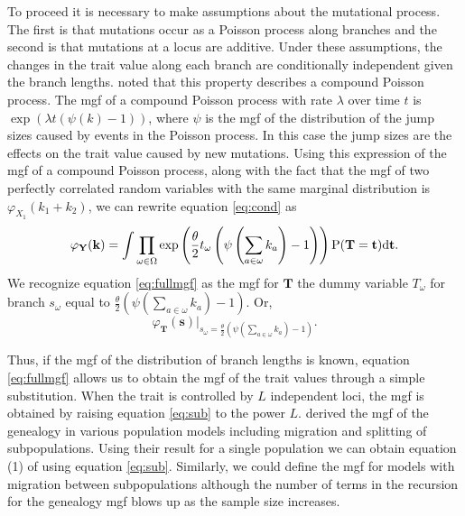 To proceed it is necessary to make assumptions about the mutational process. The
first is that mutations occur as a Poisson process along branches and the second
is that mutations at a locus are additive. Under these assumptions, the changes
in the trait value along each branch are conditionally independent given the
branch lengths. \citet{Khaitovich2005} noted that this property describes a
compound Poisson process. The mgf of a compound Poisson process with rate
$\lambda$ over time $t$ is $\exp(\lambda t (\psi(k)-1))$, where $\psi$ is the
mgf of the distribution of the jump sizes caused by events in the Poisson
process. In this case the jump sizes are the effects on the trait value caused
by new mutations. Using this expression of the mgf of a compound Poisson
process, along with the fact that the mgf of two perfectly correlated random
variables with the same marginal distribution is $\varphi_{X_1}(k_1+k_2)$, we
can rewrite equation \eqref{eq:cond} as
\begin{equation}
  \label{eq:fullmgf}
  \varphi_{\mathbf{Y}}(\mathbf{k}) = 
  \int \prod_{\omega \in \Omega} \exp\left( \frac{\theta}{2} t_{\omega} \left( \psi\left(\sum_{a \in \omega}k_{a}\right) -1 \right)\right)
  \mathrm{P}(\mathbf{T}=\mathbf{t})\mbox{d}\mathbf{t}.
\end{equation}
We recognize equation \eqref{eq:fullmgf} as the mgf for $\mathbf{T}$ the dummy
variable $T_{\omega}$ for branch $s_\omega$ equal to
$\frac{\theta}{2} \left( \psi(\sum_{a \in \omega}k_{a}) -1 \right)$. Or,
\begin{equation}
  \label{eq:sub}
  \varphi_{\mathbf{T}}(\mathbf{s})\Bigr|_{s_{\omega}=\frac{\theta}{2} \left( \psi\left(\sum_{a \in \omega}k_{a}\right) -1 \right)}.
\end{equation}

Thus, if the mgf of the distribution of branch lengths is known, equation
\eqref{eq:fullmgf} allows us to obtain the mgf of the trait values through a
simple substitution. When the trait is controlled by $L$ independent loci, the
mgf is obtained by raising equation \eqref{eq:sub} to the power $L$.
\citet{Lohse2011} derived the mgf of the genealogy in various population models
including migration and splitting of subpopulations. Using their result for a
single population we can obtain equation (1) of \citet{Schraiber2015} using
equation \eqref{eq:sub}. Similarly, we could define the mgf for models with
migration between subpopulations although the number of terms in the recursion
for the genealogy mgf blows up as the sample size increases.


